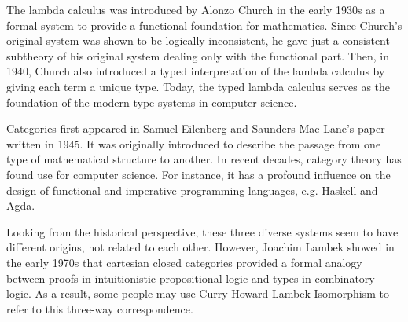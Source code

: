 The lambda calculus was introduced by Alonzo Church in the early 1930s as a formal system to provide a functional foundation for mathematics. Since Church's original system was shown to be logically inconsistent, he gave just a consistent subtheory of his original system dealing only with the functional part. Then, in 1940, Church also introduced a typed interpretation of the lambda calculus by giving each term a unique type. Today, the typed lambda calculus serves as the foundation of the modern type systems in computer science.

Categories first appeared in Samuel Eilenberg and Saunders Mac Lane's paper written in 1945. It was originally introduced to describe the passage from one type of mathematical structure to another. In recent decades, category theory has found use for computer science. For instance, it has a profound influence on the design of functional and imperative programming languages, e.g. Haskell and Agda.

Looking from the historical perspective, these three diverse systems seem to have different origins, not related to each other. However, Joachim Lambek showed in the early 1970s that cartesian closed categories provided a formal analogy between proofs in intuitionistic propositional logic and types in combinatory logic. As a result, some people may use Curry-Howard-Lambek Isomorphism to refer to this three-way correspondence.